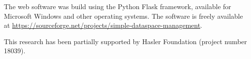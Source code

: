 \documentclass[USenglish,twocolumn]{article}
\begin{document}
The web software was build using the Python Flask framework, available
for Microsoft Windows and other operating systems. The software is
freely available at
\url{https://sourceforge.net/projects/simple-dataspace-management}.

This research has been partially supported by Hasler Foundation (project
number 18039).



\end{document}
